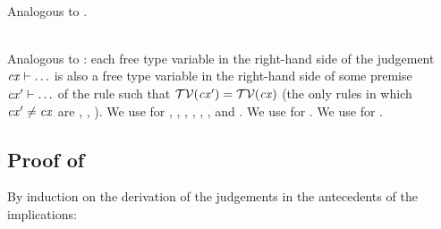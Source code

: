 \begin{bycase}
\Case{\Reabs}
\begin{derivation}
\steP{\ftvar{\absO}=\ftvar{\typ}\cup\ftvar{\expr}}
\end{derivation}

\Case{\Rthax}\\
Analogous to \Reop.

\Case{\Rthbool}
      {}

\Case{\restrules}\\
Analogous to \Rtinst: each free type variable in the right-hand side of the
judgement $\mathit{cx}\vdash\ldots$ is also a free type variable in the right-hand side
of some premise $\mathit{cx}'\vdash\ldots$ of the rule such that
$\mathcal{TV}(\mathit{cx}')=\mathcal{TV}(\mathit{cx})$ (the only rules in which $\mathit{cx}'\neq\mathit{cx}$ are \Reif,
\Rthifsbs, \Rthif). We use  for \Rstrefl, \Rstarr,
\Rstrec, \Redesc, \Rthext, \Rthrec, and \Rthprojsub. We use
 for \Reabsalpha. We use
 for \Rthabs.

\end{bycase}



\subsection*{Proof of }

By induction on the derivation of the judgements in the antecedents of the
implications:

